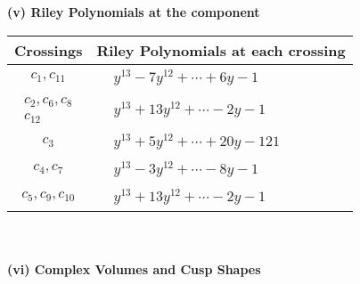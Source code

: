 \documentclass[1p]{elsarticle_modified}
\theoremstyle{definition}
\begin{document}
\newpage\renewcommand{\arraystretch}{1}
\flushleft \textbf{(v) Riley Polynomials at the component}\newline \\
\begin{tabular}{m{50pt}|m{274pt}}
Crossings & \hspace{64pt}Riley Polynomials at each crossing \\
\hline $$\begin{aligned}c_{1},c_{11}\end{aligned}$$&$\begin{aligned}
&y^{13}-7 y^{12}+\cdots+6 y-1
\end{aligned}$\\
\hline $$\begin{aligned}c_{2},c_{6},c_{8}\\c_{12}\end{aligned}$$&$\begin{aligned}
&y^{13}+13 y^{12}+\cdots-2 y-1
\end{aligned}$\\
\hline $$\begin{aligned}c_{3}\end{aligned}$$&$\begin{aligned}
&y^{13}+5 y^{12}+\cdots+20 y-121
\end{aligned}$\\
\hline $$\begin{aligned}c_{4},c_{7}\end{aligned}$$&$\begin{aligned}
&y^{13}-3 y^{12}+\cdots-8 y-1
\end{aligned}$\\
\hline $$\begin{aligned}c_{5},c_{9},c_{10}\end{aligned}$$&$\begin{aligned}
&y^{13}+13 y^{12}+\cdots-2 y-1
\end{aligned}$\\
\hline
\end{tabular}\\~\\
\newpage\flushleft \textbf{(vi) Complex Volumes and Cusp Shapes}
\end{document}
